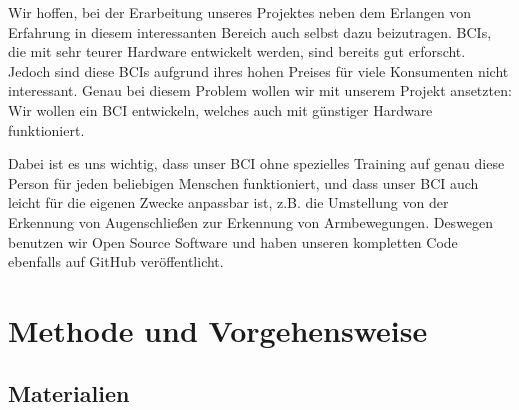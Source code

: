 \documentclass[11pt]{scrartcl}
\begin{document}
	Wir hoffen, bei der Erarbeitung unseres Projektes neben dem Erlangen von Erfahrung in diesem interessanten Bereich auch selbst dazu beizutragen. BCIs, die mit sehr teurer Hardware entwickelt werden, sind bereits gut erforscht. Jedoch sind diese BCIs aufgrund ihres hohen Preises für viele Konsumenten nicht interessant. Genau bei diesem Problem wollen wir mit unserem Projekt ansetzten: Wir wollen ein BCI entwickeln, welches auch mit günstiger Hardware funktioniert.
	
	Dabei ist es uns wichtig, dass unser BCI ohne spezielles Training auf genau diese Person für jeden beliebigen Menschen funktioniert, und dass unser BCI auch leicht für die eigenen Zwecke anpassbar ist, z.B. die Umstellung von der Erkennung von Augenschließen zur Erkennung von Armbewegungen. Deswegen benutzen wir Open Source Software und haben unseren kompletten Code ebenfalls auf GitHub veröffentlicht.

	\section{Methode und Vorgehensweise}

	\subsection{Materialien} \label{Materialien}
\end{document}
